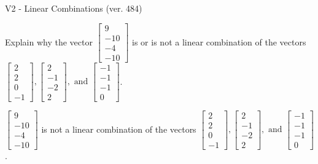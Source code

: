 \begin{exercise}
  \begin{exerciseTitle}V2 - Linear Combinations (ver. 484)\end{exerciseTitle}
  \begin{exerciseStatement}
    Explain why the vector \(\left[\begin{array}{c}
9 \\
-10 \\
-4 \\
-10
\end{array}\right]\)  is or is not a linear 
	combination of the vectors \(\left[\begin{array}{c}
2 \\
2 \\
0 \\
-1
\end{array}\right] , \left[\begin{array}{c}
2 \\
-1 \\
-2 \\
2
\end{array}\right] , \text{ and } \left[\begin{array}{c}
-1 \\
-1 \\
-1 \\
0
\end{array}\right]\).
	


  \end{exerciseStatement}
  \begin{exerciseAnswer}
   \(\left[\begin{array}{c}
9 \\
-10 \\
-4 \\
-10
\end{array}\right]\) 
  	 is not  
	a linear combination of the vectors \(\left[\begin{array}{c}
2 \\
2 \\
0 \\
-1
\end{array}\right] , \left[\begin{array}{c}
2 \\
-1 \\
-2 \\
2
\end{array}\right] , \text{ and } \left[\begin{array}{c}
-1 \\
-1 \\
-1 \\
0
\end{array}\right]\).

	
  


  \end{exerciseAnswer}
\end{exercise}